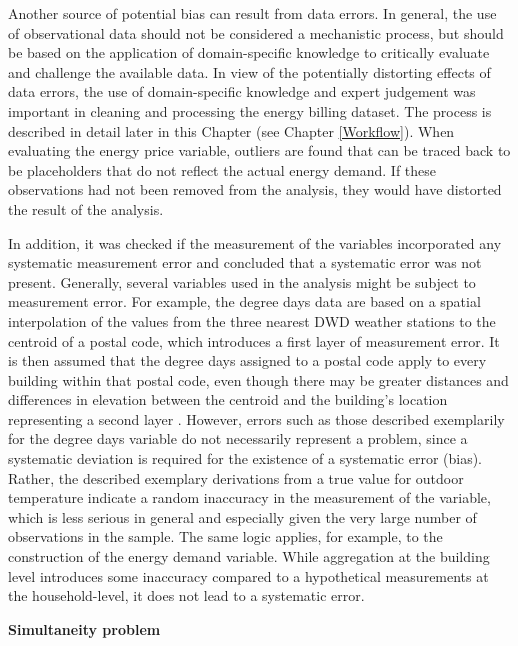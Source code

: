 \documentclass[12pt,twoside]{reedthesis}
\begin{document}
Another source of potential bias can result from data errors. In general, the use of observational data should not be considered a mechanistic process, but should be based on the application of domain-specific knowledge to critically evaluate and challenge the available data. In view of the potentially distorting effects of data errors, the use of domain-specific knowledge and expert judgement was important in cleaning and processing the energy billing dataset. The process is described in detail later in this Chapter (see Chapter \ref{Workflow}). When evaluating the energy price variable, outliers are found that can be traced back to be placeholders that do not reflect the actual energy demand. If these observations had not been removed from the analysis, they would have distorted the result of the analysis.

In addition, it was checked if the measurement of the variables incorporated any systematic measurement error and concluded that a systematic error was not present. Generally, several variables used in the analysis might be subject to measurement error. For example, the degree days data are based on a spatial interpolation of the values from the three nearest DWD weather stations to the centroid of a postal code, which introduces a first layer of measurement error. It is then assumed that the degree days assigned to a postal code apply to every building within that postal code, even though there may be greater distances and differences in elevation between the centroid and the building's location representing a second layer . However, errors such as those described exemplarily for the degree days variable do not necessarily represent a problem, since a systematic deviation is required for the existence of a systematic error (bias). Rather, the described exemplary derivations from a true value for outdoor temperature indicate a random inaccuracy in the measurement of the variable, which is less serious in general and especially given the very large number of observations in the sample. The same logic applies, for example, to the construction of the energy demand variable. While aggregation at the building level introduces some inaccuracy compared to a hypothetical measurements at the household-level, it does not lead to a systematic error.

\textbf{Simultaneity problem}
\end{document}
